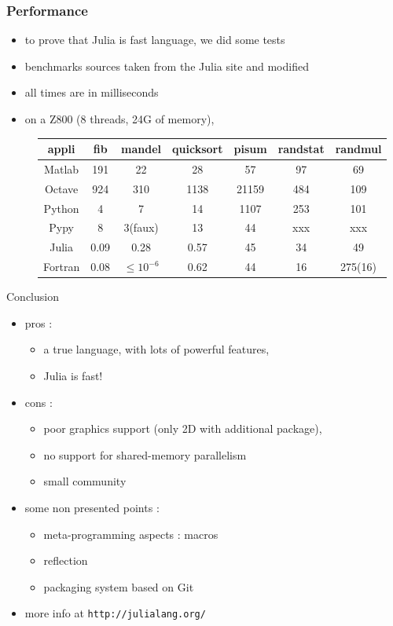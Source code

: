 \documentclass[11pt,mathserif]{beamer}
\newcommand{\julia}{{ Julia}{} }
\newcommand{\matlab}{{ Matlab}{} }
\begin{document}
\begin{frame}[fragile]
  \frametitle{Performance}
  \begin{itemize}[<+->]
    \item to prove that \julia is fast language, we did some tests
    \item benchmarks sources taken from the Julia site and modified
    \item all times are in milliseconds
    \item on a Z800 (8 threads, 24G of memory), 
  \end{itemize}
  \pause
  \begin{figure}[H]
    \begin{tabular}{|c|c|c|c|c|c|c|}
      \hline
      appli & fib & mandel & quicksort & pisum & randstat & randmul \\
      \hline
      \matlab & 191 & 22 & 28 & 57 & 97 & 69 \\
      Octave & 924 & 310 & 1138 & 21159 & 484 & 109 \\
      Python &  4  & 7  & 14 & 1107 & 253 & 101 \\
      Pypy   & 8  &  3(faux) & 13 & 44 & xxx &xxx \\ 
      Julia  & 0.09 & 0.28 & 0.57 & 45 & 34 & 49 \\
      Fortran & 0.08 & $\leqslant 10^{-6}$ & 0.62 & 44 & 16 & 275(16) \\
      \hline
    \end{tabular}
  \end{figure}
\end{frame}

\begin{frame}[fragile]{Conclusion}
  \begin{itemize}[<+->] 
    \item pros : 
    \begin{itemize}
      \item  a true language, with lots of powerful features,  
      \item \julia is fast! 
    \end{itemize}
    \item cons : 
    \begin{itemize}
      \item poor graphics support (only 2D with additional package),
      \item no support for shared-memory parallelism 
      \item small community 
    \end{itemize}
    \item some non presented points : 
    \begin{itemize}
      \item meta-programming aspects : macros 
      \item reflection 
      \item packaging system based on Git
    \end{itemize} 
    \item more info at \texttt{http://julialang.org/}
  \end{itemize} 
\end{frame}
\end{document}
